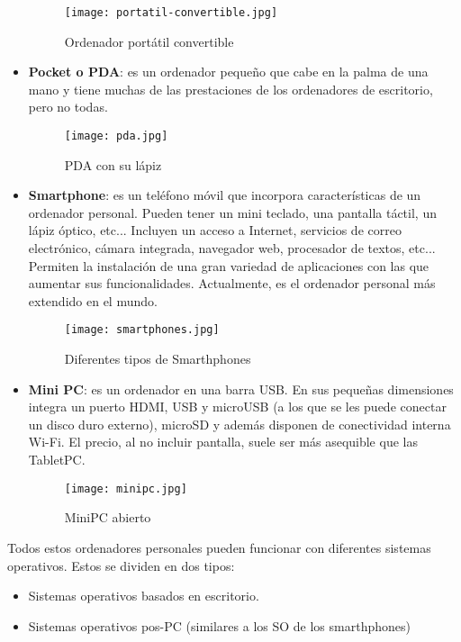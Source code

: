 \begin{itemize}
    \begin{figure}[ht]
        \centering
        \texttt{[image: portatil-convertible.jpg]}
        \caption{Ordenador portátil convertible}
    \end{figure}

    \item \textbf{Pocket o PDA}: es un ordenador pequeño que cabe en la palma de una mano y tiene muchas de las prestaciones de los ordenadores de escritorio, pero no todas.

    \begin{figure}[ht]
        \centering
        \texttt{[image: pda.jpg]}
        \caption{PDA con su lápiz}
    \end{figure}

    \item \textbf{Smartphone}: es un teléfono móvil que incorpora características de un ordenador personal. Pueden tener un mini teclado, una pantalla táctil, un lápiz óptico, etc... Incluyen un acceso a Internet, servicios de correo electrónico, cámara integrada, navegador web, procesador de textos, etc... Permiten la instalación de una gran variedad de aplicaciones con las que aumentar sus funcionalidades. Actualmente, es el ordenador personal más extendido en el mundo.

    \begin{figure}[ht]
        \centering
        \texttt{[image: smartphones.jpg]}
        \caption{Diferentes tipos de Smarthphones}
    \end{figure}

    \item \textbf{Mini PC}: es un ordenador en una barra USB. En sus pequeñas dimensiones integra un puerto HDMI, USB y microUSB (a los que se les puede conectar un disco duro externo), microSD y además disponen de conectividad interna Wi-Fi. El precio, al no incluir pantalla, suele ser más asequible que las TabletPC.

    \begin{figure}[ht]
        \centering
        \texttt{[image: minipc.jpg]}
        \caption{MiniPC abierto}
    \end{figure}
\end{itemize}

Todos estos ordenadores personales pueden funcionar con diferentes sistemas operativos.  Estos se dividen en dos tipos:

\begin{itemize}
    \item Sistemas operativos basados en escritorio.
    \item Sistemas operativos pos-PC (similares a los SO de los smarthphones)
\end{itemize}

